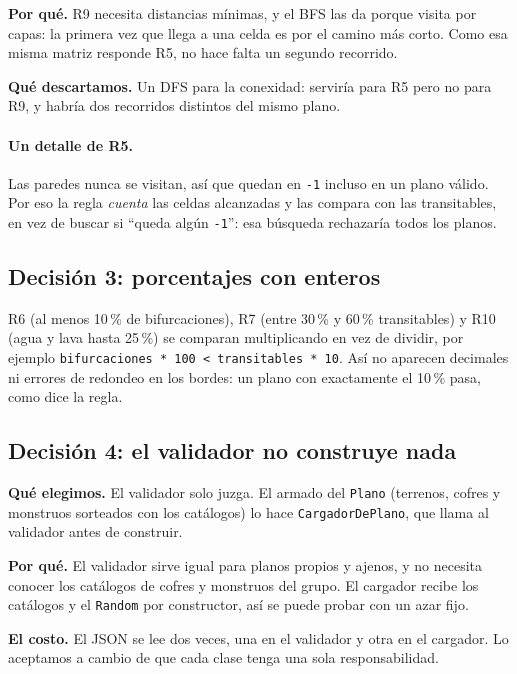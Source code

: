 \documentclass[11pt,a4paper]{article}
\begin{document}
\textbf{Por qu\'e.} R9 necesita distancias m\'inimas, y el BFS las da porque
visita por capas: la primera vez que llega a una celda es por el camino m\'as
corto. Como esa misma matriz responde R5, no hace falta un segundo recorrido.

\textbf{Qu\'e descartamos.} Un DFS para la conexidad: servir\'ia para R5 pero no
para R9, y habr\'ia dos recorridos distintos del mismo plano.

\paragraph{Un detalle de R5.} Las paredes nunca se visitan, as\'i que quedan en
\texttt{-1} incluso en un plano v\'alido. Por eso la regla \emph{cuenta} las
celdas alcanzadas y las compara con las transitables, en vez de buscar si
``queda alg\'un \texttt{-1}'': esa b\'usqueda rechazar\'ia todos los planos.

\subsection*{Decisi\'on 3: porcentajes con enteros}

R6 (al menos 10\,\% de bifurcaciones), R7 (entre 30\,\% y 60\,\% transitables)
y R10 (agua y lava hasta 25\,\%) se comparan multiplicando en vez de dividir,
por ejemplo \texttt{bifurcaciones * 100 < transitables * 10}. As\'i no
aparecen decimales ni errores de redondeo en los bordes: un plano con
exactamente el 10\,\% pasa, como dice la regla.

\subsection*{Decisi\'on 4: el validador no construye nada}

\textbf{Qu\'e elegimos.} El validador solo juzga. El armado del \texttt{Plano}
(terrenos, cofres y monstruos sorteados con los cat\'alogos) lo hace
\texttt{CargadorDePlano}, que llama al validador antes de construir.

\textbf{Por qu\'e.} El validador sirve igual para planos propios y ajenos, y
no necesita conocer los cat\'alogos de cofres y monstruos del grupo. El cargador
recibe los cat\'alogos y el \texttt{Random} por constructor, as\'i se puede
probar con un azar fijo.

\textbf{El costo.} El JSON se lee dos veces, una en el validador y otra en el
cargador. Lo aceptamos a cambio de que cada clase tenga una sola
responsabilidad.
\end{document}
